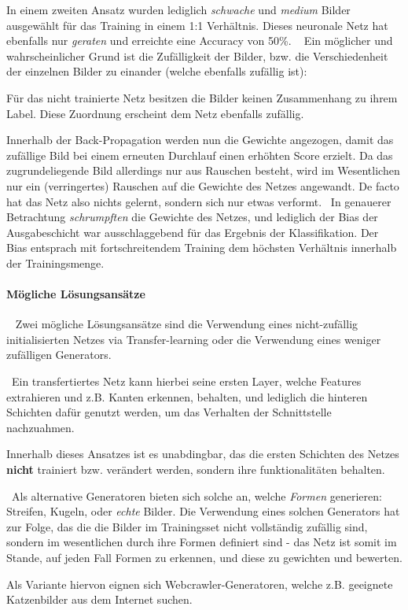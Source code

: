 In einem zweiten Ansatz wurden lediglich \textit{schwache} und \textit{medium} Bilder ausgewählt für das Training in einem 1:1 Verhältnis. Dieses neuronale Netz hat ebenfalls nur \textit{geraten} und erreichte eine Accuracy von 50\%.    
~\newline
Ein möglicher und wahrscheinlicher Grund ist die Zufälligkeit der Bilder, bzw. die Verschiedenheit der einzelnen Bilder zu einander (welche ebenfalls zufällig ist):

Für das nicht trainierte Netz besitzen die Bilder keinen Zusammenhang zu ihrem Label. Diese Zuordnung erscheint dem Netz ebenfalls zufällig. 

Innerhalb der Back-Propagation \cite{zhou_understanding_2018} werden nun die Gewichte angezogen, damit das zufällige Bild bei einem erneuten Durchlauf einen erhöhten Score erzielt. Da das zugrundeliegende Bild allerdings nur aus Rauschen besteht, wird im Wesentlichen nur ein (verringertes) Rauschen auf die Gewichte des Netzes angewandt. De facto hat das Netz also nichts gelernt, sondern sich nur etwas verformt. 
~\newline In genauerer Betrachtung \textit{schrumpften} die Gewichte des Netzes, und lediglich der Bias der Ausgabeschicht war ausschlaggebend für das Ergebnis der Klassifikation. Der Bias entsprach mit fortschreitendem Training dem höchsten Verhältnis innerhalb der Trainingsmenge.

\paragraph{Mögliche Lösungsansätze}~\newline
Zwei mögliche Lösungsansätze sind die Verwendung eines nicht-zufällig initialisierten Netzes via Transfer-learning \cite{todo} oder die Verwendung eines weniger zufälligen Generators.

~\newline Ein transfertiertes Netz kann hierbei seine ersten Layer, welche Features extrahieren und z.B. Kanten erkennen, behalten, und lediglich die hinteren Schichten dafür genutzt werden, um das Verhalten der Schnittstelle nachzuahmen. 

Innerhalb dieses Ansatzes ist es unabdingbar, das die ersten Schichten des Netzes \textbf{nicht} trainiert bzw. verändert werden, sondern ihre funktionalitäten behalten. 

~\newline Als alternative Generatoren bieten sich solche an, welche \textit{Formen} generieren: Streifen, Kugeln, oder \textit{echte} Bilder. Die Verwendung eines solchen Generators hat zur Folge, das die die Bilder im Trainingsset nicht vollständig zufällig sind, sondern im wesentlichen durch ihre Formen definiert sind - das Netz ist somit im Stande, auf jeden Fall Formen zu erkennen, und diese zu gewichten und bewerten.

Als Variante hiervon eignen sich Webcrawler-Generatoren, welche z.B. geeignete Katzenbilder aus dem Internet suchen.   